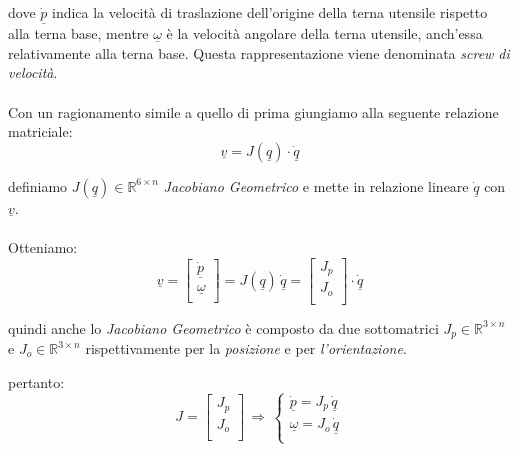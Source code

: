 dove $\dot{\underline{p}}$ indica la velocità di traslazione dell'origine della terna utensile rispetto alla terna base, mentre $\underline{\omega}$ è la velocità angolare della terna utensile, anch'essa relativamente alla terna base. Questa rappresentazione viene denominata \emph{screw di velocità}.

\paragraph{}
Con un ragionamento simile a quello di prima giungiamo alla seguente relazione matriciale:
\begin{equation}
	\underline{v} = J(\underline{q}) \cdot \dot{\underline{q}}
\end{equation}

definiamo $J(\underline{q}) \in \mathbb{R}^{6\times n}$ \emph{Jacobiano Geometrico} e mette in relazione lineare $\dot{\underline{q}}$ con $\underline{v}$. 

\paragraph{}
Otteniamo: 
\begin{equation}
	\underline{v} = 
	\begin{bmatrix}
		\underline{\dot{p}} \\
		\underline{\omega} \\
	\end{bmatrix}
	= J(\underline{q})\,\dot{\underline{q}} =
	\begin{bmatrix}
		J_p \\
		J_o \\
	\end{bmatrix}
	\cdot\underline{\dot{q}}
\end{equation}

quindi anche lo \emph{Jacobiano Geometrico} è composto da due sottomatrici $J_p \in\mathbb{R}^{3 \times n}$ e $J_o\in\mathbb{R}^{3 \times n}$ rispettivamente per la \emph{posizione} e per \emph{l'orientazione}.

pertanto:
\begin{equation}
	J = 
	\begin{bmatrix}
		J_p \\
		J_o \\
	\end{bmatrix}
	\, \Rightarrow \,
	\begin{cases}
		\underline{\dot{p}} = J_p \, \underline{\dot{q}} \\
		\underline{\omega} = J_o \, \underline{\dot{q}} \\
	\end{cases}
\end{equation}

